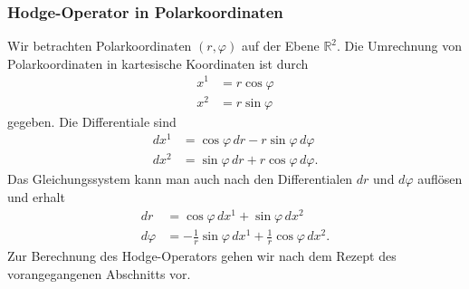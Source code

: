 \subsubsection{Hodge-Operator in Polarkoordinaten}
Wir betrachten Polarkoordinaten $(r,\varphi)$ auf der Ebene $\mathbb{R}^2$.
Die Umrechnung von Polarkoordinaten in kartesische Koordinaten ist durch
\begin{align*}
x^1 &= r\cos\varphi \\
x^2 &= r\sin\varphi
\end{align*}
gegeben.
Die Differentiale sind
\begin{align*}
dx^1 &= \cos\varphi\,dr - r\sin\varphi\,d\varphi \\
dx^2 &= \sin\varphi\,dr + r\cos\varphi\,d\varphi.
\end{align*}
Das Gleichungssystem kann man auch nach den Differentialen $dr$
und $d\varphi$ auflösen und erhalt
\begin{align*}
dr       &= \cos\varphi\, dx^1 + \sin\varphi\, dx^2 \\
d\varphi &= -\frac1r \sin\varphi\,dx^1 + \frac1r\cos\varphi\,dx^2.
\end{align*}
Zur Berechnung des Hodge-Operators gehen wir nach dem Rezept des 
vorangegangenen Abschnitts vor.
